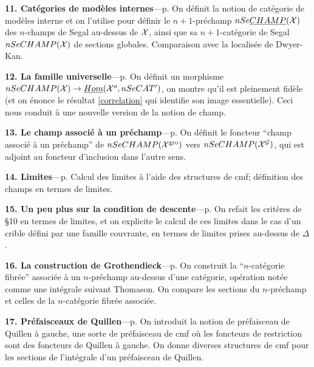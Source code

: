 \documentclass[12pt]{article}
\newcommand{\Gg}{{\cal G}}
\newcommand{\Xx}{{\cal X}}
\begin{document}
\noindent
{\bf 11. Cat\'egories de mod\`eles internes}---p.
\pageref{cmipage}
\newline
{\small
On d\'efinit la notion de cat\'egorie de mod\`eles interne et on l'utilise pour
d\'efinir le $n+1$-pr\'echamp $nSe\underline{CHAMP}(\Xx )$ des $n$-champs de
Segal au-dessus de $\Xx$, ainsi que sa $n+1$-cat\'egorie de Segal
$nSeCHAMP(\Xx )$ de sections globales.
Comparaison avec la localis\'ee de Dwyer-Kan.}

\noindent
{\bf 12. La famille universelle}---p.
\pageref{universellepage}
\newline
{\small
On d\'efinit un morphisme $nSeCHAMP(\Xx )\rightarrow \underline{Hom}(\Xx ^o,
nSeCAT')$, on montre qu'il est pleinement fid\`ele (et on \'enonce le
r\'esultat \ref{correlation}
qui identifie son image essentielle). Ceci nous conduit \`a une nouvelle version
de la notion de champ.}

\noindent
{\bf 13. Le champ associ\'e \`a un pr\'echamp}---p.
\pageref{associepage}
\newline
{\small
On d\'efinit le foncteur
``champ associ\'e \`a un pr\'echamp'' de $nSeCHAMP(\Xx ^{\rm gro})$ vers
\newline
$nSeCHAMP (\Xx ^{\Gg})$, qui est adjoint au foncteur d'inclusion dans l'autre
sens.
}

\noindent
{\bf 14. Limites}---p.
\pageref{limitespage}
\newline
{\small
Calcul des limites \`a l'aide des structures de cmf;
d\'efinition des champs en termes de limites. }

\noindent
{\bf 15. Un peu plus sur la condition de descente}---p.
\pageref{peupluspage}
\newline
{\small
On refait les crit\`eres de \S 10 en termes de limites, et on explicite le
calcul de ces limites dans le cas d'un crible d\'efini par une famille
couvrante, en termes de limites prises au-dessus de $\Delta$. }


\noindent
{\bf 16. La construction de Grothendieck}---p.
\pageref{gropage}
\newline
{\small
On construit la ``$n$-cat\'egorie fibr\'ee'' associ\'ee \`a un $n$-pr\'echamp
au-dessus d'une cat\'egorie, o\-p\'e\-ra\-tion not\'ee comme une
int\'egrale suivant
Thomason. On compare les sections du $n$-pr\'echamp et celles de la
$n$-cat\'egorie
fibr\'ee associ\'ee.
}

\noindent
{\bf 17. Pr\'efaisceaux de Quillen}---p.
\pageref{quipage}
\newline
{\small
On introduit la notion de pr\'efaisceau de Quillen \`a gauche, une sorte de
pr\'efaisceau de cmf
o\`u les foncteurs de restriction sont des foncteurs de Quillen \`a gauche. On
donne diverses structures de cmf pour les sections de l'int\'egrale d'un
pr\'efaisceau de Quillen. }
\end{document}
